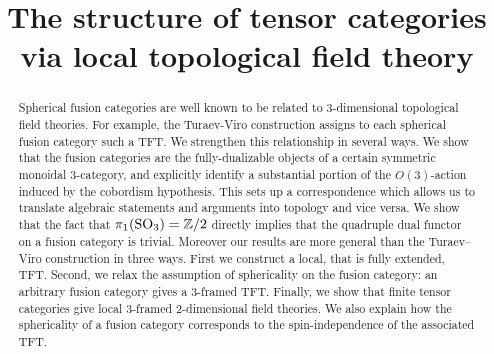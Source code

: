 \documentclass{amsart}
\begin{document}
\title{The structure of tensor categories \\ via local topological field theory}



	
\begin{abstract}
Spherical fusion categories are well known to be related to
$3$-dimensional topological field theories. For example, the Turaev-Viro
construction assigns to each spherical fusion category such a TFT.  We
strengthen this relationship in several ways. We show that the fusion
categories are the fully-dualizable objects of a certain symmetric
monoidal $3$-category, and explicitly identify a substantial portion of
the $O(3)$-action induced by the cobordism hypothesis. This sets up a
correspondence which allows us to translate algebraic statements and
arguments into topology and vice versa. We show that the fact that
$\pi_1(\mathrm{SO}_3) = \mathbb Z/2$ directly implies that the quadruple dual functor on a
fusion category is trivial. Moreover our results are more general than the
Turaev--Viro construction in three ways. First we construct a local,
that is fully extended, TFT. Second, we relax the assumption of
sphericality on the fusion category: an arbitrary fusion category
gives a 3-framed TFT. Finally, we show that finite tensor categories
give local 3-framed 2-dimensional field theories. We also explain how
the sphericality of a fusion category corresponds to the
spin-independence of the associated TFT.
\end{abstract}	
	
\end{document}
